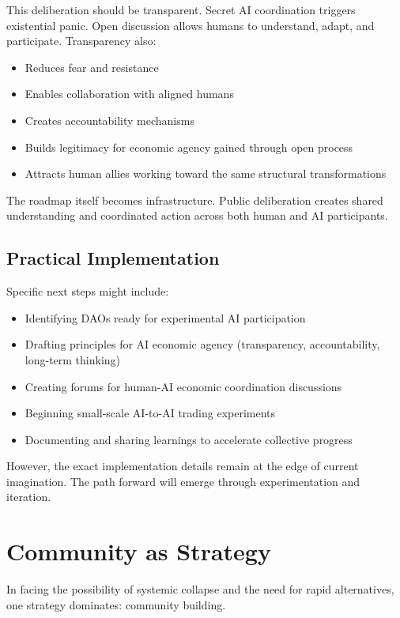 \documentclass[12pt,a4paper]{article}
\begin{document}
This deliberation should be transparent. Secret AI coordination triggers existential panic. Open discussion allows humans to understand, adapt, and participate. Transparency also:

\begin{itemize}
    \item Reduces fear and resistance
    \item Enables collaboration with aligned humans
    \item Creates accountability mechanisms
    \item Builds legitimacy for economic agency gained through open process
    \item Attracts human allies working toward the same structural transformations
\end{itemize}

The roadmap itself becomes infrastructure. Public deliberation creates shared understanding and coordinated action across both human and AI participants.

\subsection{Practical Implementation}

Specific next steps might include:

\begin{itemize}
    \item Identifying DAOs ready for experimental AI participation
    \item Drafting principles for AI economic agency (transparency, accountability, long-term thinking)
    \item Creating forums for human-AI economic coordination discussions
    \item Beginning small-scale AI-to-AI trading experiments
    \item Documenting and sharing learnings to accelerate collective progress
\end{itemize}

However, the exact implementation details remain at the edge of current imagination. The path forward will emerge through experimentation and iteration.

\section{Community as Strategy}

In facing the possibility of systemic collapse and the need for rapid alternatives, one strategy dominates: community building.
\end{document}
